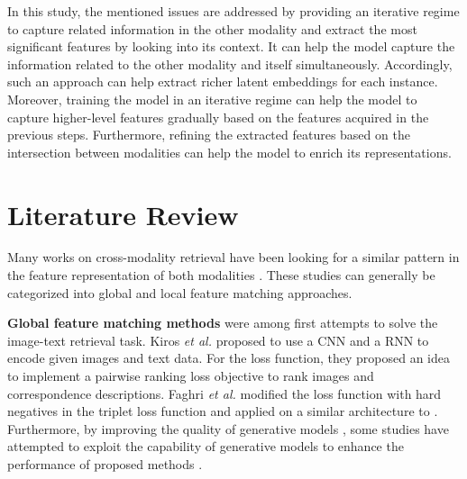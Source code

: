 \documentclass{midl}
\begin{document}
In this study, the mentioned issues are addressed by providing an iterative regime to capture related information in the other modality and extract the most significant features by looking into its context. It can help the model capture the information related to the other modality and itself simultaneously. Accordingly, such an approach can help extract richer latent embeddings for each instance. Moreover, training the model in an iterative regime can help the model to capture higher-level features gradually based on the features acquired in the previous steps. Furthermore, refining the extracted features based on the intersection between modalities can help the model to enrich its representations. 


\section{Literature Review}


Many works on cross-modality retrieval have been looking for a similar pattern in the feature representation of both modalities \cite{karpathy2015deep,lee2018stacked, huang2018learning,lu202012,radford2021learning}. These studies can generally be categorized into global and local feature matching approaches. 

\textbf{Global feature matching methods} were among first attempts to solve the image-text retrieval task. Kiros \textit{et al.} \cite{kiros2014unifying} proposed to use a CNN and a RNN to encode given images and text data. For the loss function, they proposed an idea to implement a pairwise ranking loss objective to rank images and correspondence descriptions. Faghri \textit{et al.} \cite{faghri2017vse++} modified the loss function with hard negatives in the triplet loss function and applied on a similar architecture to \cite{kiros2014unifying}. Furthermore, by improving the quality of generative models \cite{zhu2017unpaired,karras2019style}, some studies have  attempted to exploit the capability of generative models to enhance the performance of proposed methods \cite{patrick2020support,peng2019cm,gu2018look}.
\end{document}
